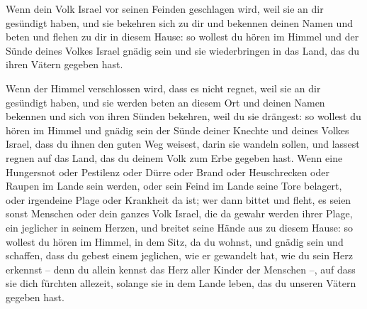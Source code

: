  Wenn dein Volk Israel vor seinen Feinden geschlagen
wird, weil sie an dir gesündigt haben, und sie bekehren sich zu dir und
bekennen deinen Namen und beten und flehen zu dir in diesem Hause:
 so wollest du hören im Himmel und der Sünde deines
Volkes Israel gnädig sein und sie wiederbringen in das Land, das du
ihren Vätern gegeben hast.

 Wenn der Himmel verschlossen wird, dass es nicht regnet,
weil sie an dir gesündigt haben, und sie werden beten an diesem Ort und
deinen Namen bekennen und sich von ihren Sünden bekehren, weil du sie
drängest:  so wollest du hören im Himmel und gnädig sein
der Sünde deiner Knechte und deines Volkes Israel, dass du ihnen den
guten Weg weisest, darin sie wandeln sollen, und lassest regnen auf das
Land, das du deinem Volk zum Erbe gegeben hast.  Wenn
eine Hungersnot oder Pestilenz oder Dürre oder Brand oder Heuschrecken
oder Raupen im Lande sein werden, oder sein Feind im Lande seine Tore
belagert, oder irgendeine Plage oder Krankheit da ist; 
wer dann bittet und fleht, es seien sonst Menschen oder dein ganzes Volk
Israel, die da gewahr werden ihrer Plage, ein jeglicher in seinem
Herzen, und breitet seine Hände aus zu diesem Hause:  so
wollest du hören im Himmel, in dem Sitz, da du wohnst, und gnädig sein
und schaffen, dass du gebest einem jeglichen, wie er gewandelt hat, wie
du sein Herz erkennst -- denn du allein kennst das Herz aller Kinder der
Menschen --,  auf dass sie dich fürchten allezeit,
solange sie in dem Lande leben, das du unseren Vätern gegeben hast.

